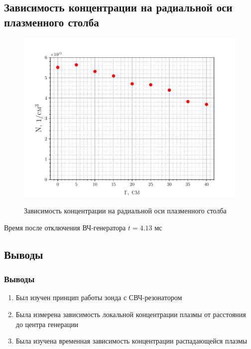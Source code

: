 \documentclass[10pt,pdf,hyperref={unicode}, dvipsnames]{beamer}
\begin{document}
\subsection{Зависимость концентрации на радиальной оси плазменного столба}
\begin{frame}
	\begin{figure}[tb]
		\centering
		\vspace{-20pt}
		\includegraphics[width=\linewidth]{fig/radial}
		\label{fig:2}
		\vspace{-15pt}
		\caption{Зависимость концентрации на радиальной оси плазменного столба}
		\vspace{-10pt}
	\end{figure}
	Время после отключения ВЧ-генератора $t=4.13$ мс
\end{frame}

\subsection{Выводы}
\begin{frame}
		\vfill
		\frametitle{Выводы}
		\begin{enumerate}
			\item Был изучен принцип работы зонда с СВЧ-резонатором
			

			\item Была измерена зависимость локальной концентрации плазмы от расстояния до центра генерации
			\item Была изучена временная зависимость концентрации распадающейся плазмы
		\end{enumerate}
		\vfill
\end{frame}
\end{document}
